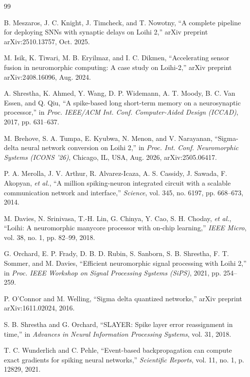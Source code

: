 \documentclass[12pt,a4paper,final]{extreport}
\begin{document}
\begingroup
{}
\begin{thebibliography}{99}

B. Meszaros, J. C. Knight, J. Timcheck, and T. Nowotny, ``A complete pipeline for deploying SNNs with synaptic delays on Loihi 2,'' arXiv preprint arXiv:2510.13757, Oct. 2025.

M. Isik, K. Tiwari, M. B. Eryilmaz, and I. C. Dikmen, ``Accelerating sensor fusion in neuromorphic computing: A case study on Loihi-2,'' arXiv preprint arXiv:2408.16096, Aug. 2024.

A. Shrestha, K. Ahmed, Y. Wang, D. P. Widemann, A. T. Moody, B. C. Van Essen, and Q. Qiu, ``A spike-based long short-term memory on a neurosynaptic processor,'' in \textit{Proc. IEEE/ACM Int. Conf. Computer-Aided Design (ICCAD)}, 2017, pp. 631--637.

M. Brehove, S. A. Tumpa, E. Kyubwa, N. Menon, and V. Narayanan, ``Sigma-delta neural network conversion on Loihi 2,'' in \textit{Proc. Int. Conf. Neuromorphic Systems (ICONS '26)}, Chicago, IL, USA, Aug. 2026, arXiv:2505.06417.

P. A. Merolla, J. V. Arthur, R. Alvarez-Icaza, A. S. Cassidy, J. Sawada, F. Akopyan, \textit{et al.}, ``A million spiking-neuron integrated circuit with a scalable communication network and interface,'' \textit{Science}, vol. 345, no. 6197, pp. 668--673, 2014.

M. Davies, N. Srinivasa, T.-H. Lin, G. Chinya, Y. Cao, S. H. Choday, \textit{et al.}, ``Loihi: A neuromorphic manycore processor with on-chip learning,'' \textit{IEEE Micro}, vol. 38, no. 1, pp. 82--99, 2018.

G. Orchard, E. P. Frady, D. B. D. Rubin, S. Sanborn, S. B. Shrestha, F. T. Sommer, and M. Davies, ``Efficient neuromorphic signal processing with Loihi 2,'' in \textit{Proc. IEEE Workshop on Signal Processing Systems (SiPS)}, 2021, pp. 254--259.

P. O'Connor and M. Welling, ``Sigma delta quantized networks,'' arXiv preprint arXiv:1611.02024, 2016.

S. B. Shrestha and G. Orchard, ``SLAYER: Spike layer error reassignment in time,'' in \textit{Advances in Neural Information Processing Systems}, vol. 31, 2018.

T. C. Wunderlich and C. Pehle, ``Event-based backpropagation can compute exact gradients for spiking neural networks,'' \textit{Scientific Reports}, vol. 11, no. 1, p. 12829, 2021.

\end{thebibliography}
\endgroup
\end{document}
